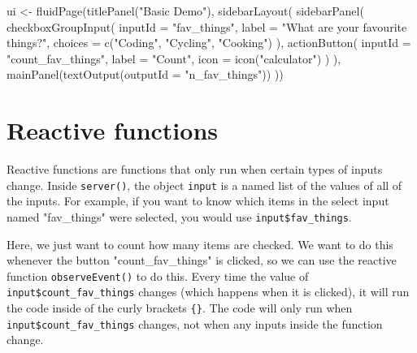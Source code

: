 \documentclass[
  oneside]{book}
\newenvironment{Shaded}{\begin{snugshade}}{\end{snugshade}}
\newcommand{\AttributeTok}[1]{\textcolor[rgb]{0.77,0.63,0.00}{#1}}
\newcommand{\FunctionTok}[1]{\textcolor[rgb]{0.00,0.00,0.00}{#1}}
\newcommand{\NormalTok}[1]{#1}
\newcommand{\OtherTok}[1]{\textcolor[rgb]{0.56,0.35,0.01}{#1}}
\newcommand{\StringTok}[1]{\textcolor[rgb]{0.31,0.60,0.02}{#1}}
\begin{document}
\begin{Shaded}
\begin{Highlighting}[]
\NormalTok{ui }\OtherTok{\textless{}{-}} \FunctionTok{fluidPage}\NormalTok{(}\FunctionTok{titlePanel}\NormalTok{(}\StringTok{"Basic Demo"}\NormalTok{),}
                \FunctionTok{sidebarLayout}\NormalTok{(}
                  \FunctionTok{sidebarPanel}\NormalTok{(}
                    \FunctionTok{checkboxGroupInput}\NormalTok{(}
                      \AttributeTok{inputId =} \StringTok{"fav\_things"}\NormalTok{,}
                      \AttributeTok{label =} \StringTok{"What are your favourite things?"}\NormalTok{,}
                      \AttributeTok{choices =} \FunctionTok{c}\NormalTok{(}\StringTok{"Coding"}\NormalTok{, }\StringTok{"Cycling"}\NormalTok{, }\StringTok{"Cooking"}\NormalTok{)}
\NormalTok{                    ),}
                    \FunctionTok{actionButton}\NormalTok{(}
                      \AttributeTok{inputId =} \StringTok{"count\_fav\_things"}\NormalTok{,}
                      \AttributeTok{label =} \StringTok{"Count"}\NormalTok{,}
                      \AttributeTok{icon =} \FunctionTok{icon}\NormalTok{(}\StringTok{"calculator"}\NormalTok{)}
\NormalTok{                    )}
\NormalTok{                  ),}
                  \FunctionTok{mainPanel}\NormalTok{(}\FunctionTok{textOutput}\NormalTok{(}\AttributeTok{outputId =} \StringTok{"n\_fav\_things"}\NormalTok{))}
\NormalTok{                ))}
\end{Highlighting}
\end{Shaded}

\hypertarget{first-reactive}{%
\section{Reactive functions}\label{first-reactive}}

Reactive functions are functions that only run when certain types of inputs change. Inside \texttt{server}\texttt{()}, the object \texttt{input} is a named list of the values of all of the inputs. For example, if you want to know which items in the select input named \StringTok{"fav\_things"} were selected, you would use \texttt{input\$fav\_things}.

Here, we just want to count how many items are checked. We want to do this whenever the button \StringTok{"count\_fav\_things"} is clicked, so we can use the reactive function \texttt{observeEvent}\texttt{()} to do this. Every time the value of \texttt{input\$count\_fav\_things} changes (which happens when it is clicked), it will run the code inside of the curly brackets \texttt{\{\}}. The code will only run when \texttt{input\$count\_fav\_things} changes, not when any inputs inside the function change.
\end{document}

